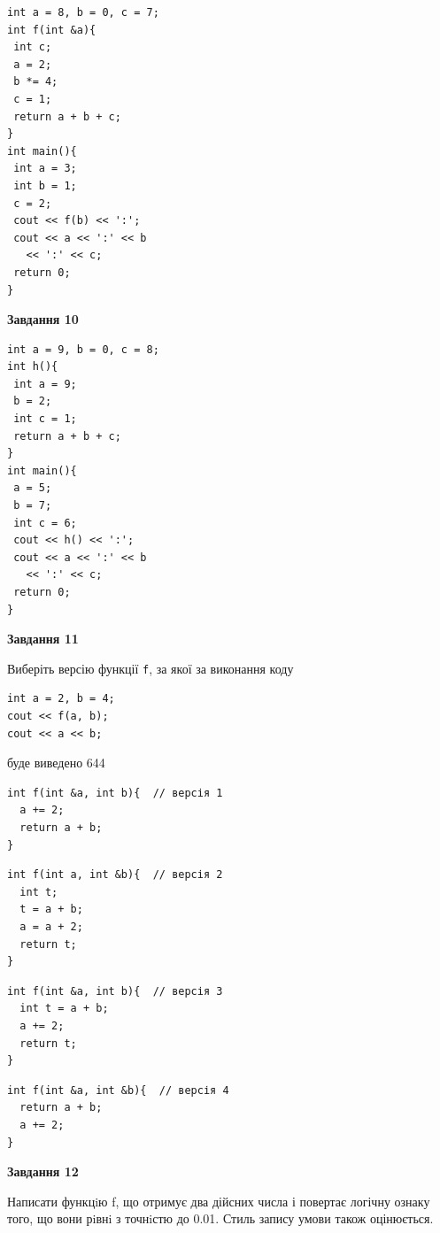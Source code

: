 \documentclass[12pt, ukrainian]{article}
\def\code#1{\Verb!#1!}
\begin{document}
{\begin {large}
\begin{minipage}[t]{7.0cm}
\begin{verbatim}
int a = 8, b = 0, c = 7;
int f(int &a){
 int c;
 a = 2;
 b *= 4;
 c = 1;
 return a + b + c;
}
int main(){
 int a = 3;
 int b = 1;
 c = 2;
 cout << f(b) << ':';
 cout << a << ':' << b 
   << ':' << c;
 return 0;
}
\end{verbatim}



\begin{center}
\textbf{Завдання 10}
\end{center}
\vspace{-8mm}

\begin{verbatim}
int a = 9, b = 0, c = 8;
int h(){
 int a = 9;
 b = 2;
 int c = 1;
 return a + b + c;
}
int main(){
 a = 5;
 b = 7;
 int c = 6;
 cout << h() << ':';
 cout << a << ':' << b 
   << ':' << c;
 return 0;
}
\end{verbatim}

\end{minipage}
\vline \hspace{1mm}
\begin{minipage}[t]{11.0cm}

\begin{center}
\textbf{Завдання 11}
\end{center}
Виберіть версію функції \code{f}, за якої за виконання коду
\begin{verbatim}
int a = 2, b = 4;
cout << f(a, b);
cout << a << b;
\end{verbatim}

буде виведено 644

\begin{verbatim}
int f(int &a, int b){  // версія 1
  a += 2;
  return a + b;
}
\end{verbatim}

\vspace{-8mm}\begin{verbatim}
int f(int a, int &b){  // версія 2
  int t;
  t = a + b;
  a = a + 2;
  return t;
}
\end{verbatim}

\vspace{-8mm}\begin{verbatim}
int f(int &a, int b){  // версія 3
  int t = a + b;
  a += 2;
  return t;
}
\end{verbatim}

\vspace{-8mm}\begin{verbatim}
int f(int &a, int &b){  // версія 4
  return a + b;
  a += 2;
}
\end{verbatim}



\begin{center}
\textbf{Завдання 12}
\end{center}

Написати функцiю f, що отримує два дійсних числа і повертає логічну ознаку того, що вони рiвнi з точнiстю до 0.01. Стиль запису умови також оцінюється.\par

\end{minipage}

\end {large}}
\end{document}
